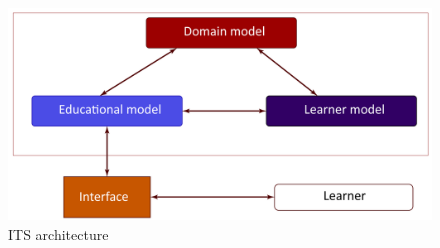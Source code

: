     \begin{figure}[H]
		\begin{center}
			\includegraphics[width=\textwidth]{images/chapitre1/ITS architecture}
		\end{center}
    \caption{ITS architecture}
    \label{itsArchitecture}
    \end{figure}

